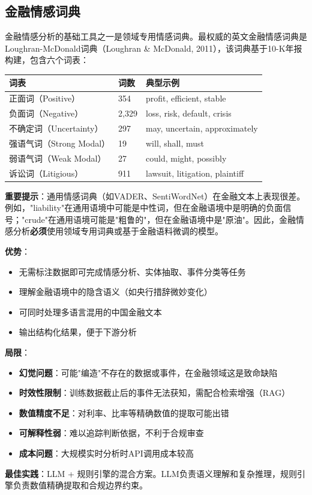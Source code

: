 \subsection{金融情感词典}

金融情感分析的基础工具之一是领域专用情感词典。最权威的英文金融情感词典是Loughran-McDonald词典（Loughran \& McDonald, 2011），该词典基于10-K年报构建，包含六个词表：

\begin{table}[H]
\centering
\begin{tabular}{llp{5cm}}
\toprule
\textbf{词表} & \textbf{词数} & \textbf{典型示例} \\
\midrule
正面词（Positive） & 354 & profit, efficient, stable \\
负面词（Negative） & 2,329 & loss, risk, default, crisis \\
不确定词（Uncertainty） & 297 & may, uncertain, approximately \\
强语气词（Strong Modal） & 19 & will, shall, must \\
弱语气词（Weak Modal） & 27 & could, might, possibly \\
诉讼词（Litigious） & 911 & lawsuit, litigation, plaintiff \\
\bottomrule
\end{tabular}
\end{table}

\textbf{重要提示}：通用情感词典（如VADER、SentiWordNet）在金融文本上表现很差。例如，"liability"在通用语境中可能是中性词，但在金融语境中是明确的负面信号；"crude"在通用语境可能是"粗鲁的"，但在金融语境中是"原油"。因此，金融情感分析\textbf{必须}使用领域专用词典或基于金融语料微调的模型。

\begin{theorybox}[大语言模型在金融文本分析中的优势与局限]
\textbf{优势}：
\begin{itemize}[leftmargin=2em]
  \item 无需标注数据即可完成情感分析、实体抽取、事件分类等任务
  \item 理解金融语境中的隐含语义（如央行措辞微妙变化）
  \item 可同时处理多语言混用的中国金融文本
  \item 输出结构化结果，便于下游分析
\end{itemize}

\textbf{局限}：
\begin{itemize}[leftmargin=2em]
  \item \textbf{幻觉问题}：可能"编造"不存在的数据或事件，在金融领域这是致命缺陷
  \item \textbf{时效性限制}：训练数据截止后的事件无法获知，需配合检索增强（RAG）
  \item \textbf{数值精度不足}：对利率、比率等精确数值的提取可能出错
  \item \textbf{可解释性弱}：难以追踪判断依据，不利于合规审查
  \item \textbf{成本问题}：大规模实时分析时API调用成本较高
\end{itemize}

\textbf{最佳实践}：LLM + 规则引擎的混合方案。LLM负责语义理解和复杂推理，规则引擎负责数值精确提取和合规边界约束。
\end{theorybox}

